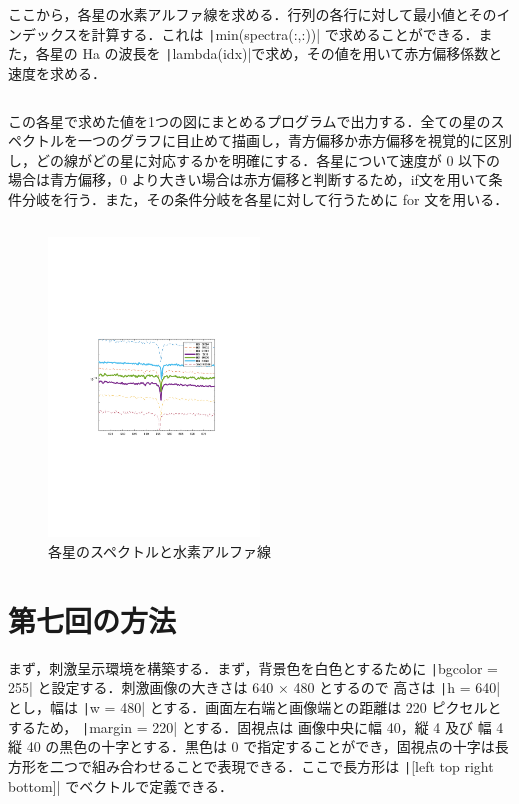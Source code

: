 \documentclass[dvipdfmx, titlepage]{jsarticle}
\begin{document}
    ここから，各星の水素アルファ線を求める．行列の各行に対して最小値とそのインデックスを計算する．これは \texttt|min(spectra(:,:))| で求めることができる．また，各星の Ha の波長を \texttt|lambda(idx)|で求め，その値を用いて赤方偏移係数と速度を求める．

    \inputminted[linenos, firstline=11, lastline=15, frame=lines, fontsize=\small]{matlab}{code/Exp3_6_2_Matlab.m}

    この各星で求めた値を1つの図にまとめるプログラムで出力する．全ての星のスペクトルを一つのグラフに目止めて描画し，青方偏移か赤方偏移を視覚的に区別し，どの線がどの星に対応するかを明確にする．各星について速度が 0 以下の場合は青方偏移，0 より大きい場合は赤方偏移と判断するため，if文を用いて条件分岐を行う．また，その条件分岐を各星に対して行うために for 文を用いる．
    \inputminted[linenos, firstline=16, lastline=27, frame=lines, fontsize=\small]{matlab}{code/Exp3_6_2_Matlab.m}

    \begin{figure}
        \centering
        \includegraphics[width=0.5\textwidth]{figure/stellar2.pdf}
        \caption{各星のスペクトルと水素アルファ線}
        \label{fig:exp3_6_spectra2}
    \end{figure}

\section{第七回の方法}
    まず，刺激呈示環境を構築する．まず，背景色を白色とするために \texttt|bgcolor = 255| と設定する．刺激画像の大きさは 640 $\times$ 480 とするので 高さは \texttt|h = 640| とし，幅は \texttt|w = 480| とする．画面左右端と画像端との距離は 220 ピクセルとするため， \texttt|margin = 220| とする．固視点は 画像中央に幅 40，縦 4 及び 幅 4 縦 40 の黒色の十字とする．黒色は 0 で指定することができ，固視点の十字は長方形を二つで組み合わせることで表現できる．ここで長方形は \texttt|[left top right bottom]| でベクトルで定義できる．
    
    \inputminted[linenos, firstline=1, lastline=12, frame=lines, fontsize=\small]{matlab}{code/Exp3_7_Matlab.m}
    \inputminted[linenos, firstline=32, lastline=33, frame=lines, fontsize=\small]{matlab}{code/Exp3_7_Matlab.m}
    \inputminted[linenos, firstline=35, lastline=36, frame=lines, fontsize=\small]{matlab}{code/Exp3_7_Matlab.m}
\end{document}
